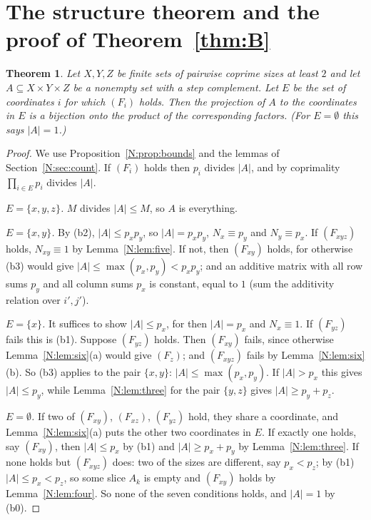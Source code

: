 \documentclass[11pt,a4paper]{amsart}
\newtheorem{theorem}{Theorem}
\theoremstyle{definition}
\theoremstyle{remark}
\begin{document}
\section{The structure theorem and the proof of Theorem~\ref{thm:B}}\label{N:sec:proof}

\begin{theorem}\label{N:thm:structure}
Let $X,Y,Z$ be finite sets of pairwise coprime sizes at least $2$ and let $A\subseteq X\times Y\times Z$ be a
nonempty set with a step complement. Let $E$ be the set of coordinates $i$ for which $(F_i)$ holds. Then the
projection of $A$ to the coordinates in $E$ is a bijection onto the product of the corresponding factors. (For
$E=\emptyset$ this says $|A|=1$.)
\end{theorem}
\begin{proof}
We use Proposition~\ref{N:prop:bounds} and the lemmas of Section~\ref{N:sec:count}. If $(F_i)$ holds then $p_i$
divides $|A|$, and by coprimality $\prod_{i\in E}p_i$ divides $|A|$.

\emph{$E=\{x,y,z\}$.} $M$ divides $|A|\le M$, so $A$ is everything.

\emph{$E=\{x,y\}$.} By (b2), $|A|\le p_xp_y$, so $|A|=p_xp_y$, $N_x\equiv p_y$ and $N_y\equiv p_x$. If $(F_{xyz})$
holds, $N_{xy}\equiv1$ by Lemma~\ref{N:lem:five}. If not, then $(F_{xy})$ holds, for otherwise (b3) would give
$|A|\le\max(p_x,p_y)<p_xp_y$; and an additive matrix with all row sums $p_y$ and all column sums $p_x$ is
constant, equal to $1$ (sum the additivity relation over $i',j'$).

\emph{$E=\{x\}$.} It suffices to show $|A|\le p_x$, for then $|A|=p_x$ and $N_x\equiv 1$. If $(F_{yz})$ fails this
is (b1). Suppose $(F_{yz})$ holds. Then $(F_{xy})$ fails, since otherwise Lemma~\ref{N:lem:six}(a) would give
$(F_z)$; and $(F_{xyz})$ fails by Lemma~\ref{N:lem:six}(b). So (b3) applies to the pair $\{x,y\}$:
$|A|\le\max(p_x,p_y)$. If $|A|>p_x$ this gives $|A|\le p_y$, while Lemma~\ref{N:lem:three} for the pair $\{y,z\}$
gives $|A|\ge p_y+p_z$.

\emph{$E=\emptyset$.} If two of $(F_{xy})$, $(F_{xz})$, $(F_{yz})$ hold, they share a coordinate, and
Lemma~\ref{N:lem:six}(a) puts the other two coordinates in $E$. If exactly one holds, say $(F_{xy})$, then
$|A|\le p_x$ by (b1) and $|A|\ge p_x+p_y$ by Lemma~\ref{N:lem:three}. If none holds but $(F_{xyz})$ does: two of
the sizes are different, say $p_x<p_z$; by (b1) $|A|\le p_x<p_z$, so some slice $A_k$ is empty and $(F_{xy})$
holds by Lemma~\ref{N:lem:four}. So none of the seven conditions holds, and $|A|=1$ by (b0).
\end{proof}
\end{document}
